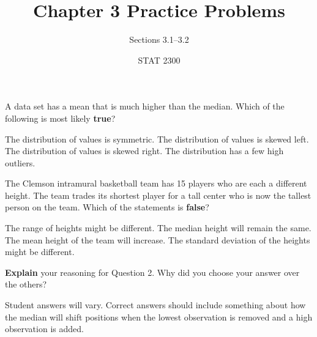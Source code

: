 \documentclass[noanswers]{exam}
\title{Chapter 3 Practice Problems}
\author{Sections 3.1--3.2}
\date{STAT 2300}
\begin{document}
%

\begin{questions} 
	
	\question A data set has a mean that is much higher than the median. Which of the following is most likely \textbf{true}?
	
	\vspace{2mm}
	
	\begin{choices}
	
		\choice The distribution of values is symmetric.
		\choice The distribution of values is skewed left.
		\CorrectChoice The distribution of values is skewed right.
		\choice The distribution has a few high outliers.	
	
	\end{choices}
	
	\vspace{3mm}
	
	\question The Clemson intramural basketball team has 15 players who are each a different height. The team trades its shortest player for a tall center who is now the tallest person on the team. Which of the statements is \textbf{false}?
	
	\vspace{2mm}
	
	\begin{choices}
	
		\choice The range of heights might be different.
		\CorrectChoice The median height will remain the same.
		\choice The mean height of the team will increase.
		\choice The standard deviation of the heights might be different.	
	
	\end{choices}
	
	\vspace{3mm}
	
	\question \textbf{Explain} your reasoning for Question 2. Why did you choose your answer over the others?
	
	\begin{solution}[\stretch{1}]
	
		
			Student answers will vary. Correct answers should include something about how the median will shift positions when the lowest observation is removed and a high observation is added.


\end{solution}
\end{questions}
\end{document}
